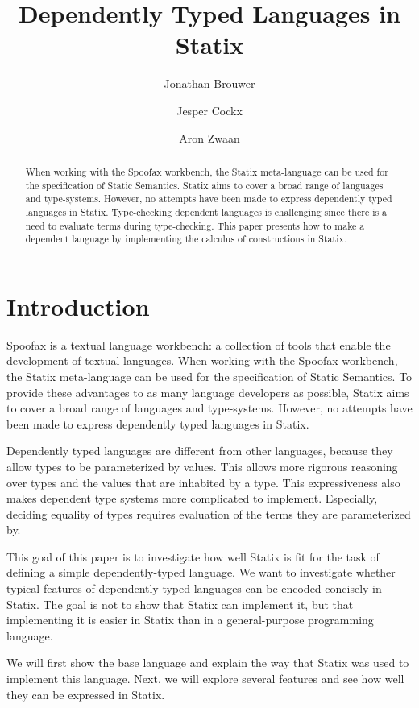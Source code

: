 \documentclass[a4paper,UKenglish,cleveref, autoref, thm-restate]{oasics-v2021}
\title{Dependently Typed Languages in Statix}
\author{Jonathan Brouwer}{Delft University of Technology, The Netherlands \and \url{http://jonathanb.nl}}{j.t.brouwer@student.tudelft.nl}{}{}
\author{Jesper Cockx}{Delft University of Technology, The Netherlands \and \url{http://jesper.sikanda.be}}{j.g.h.cockx@tudelft.nl}{}{}
\author{Aron Zwaan}{Delft University of Technology, The Netherlands \and \url{http://aronzwaan.github.io}}{a.s.zwaan@tudelft.nl}{}{}
\begin{document}
\maketitle

\begin{abstract}
When working with the Spoofax workbench, the Statix meta-language can be used for the specification of Static Semantics. Statix aims to cover a broad range of languages and type-systems. However, no attempts have been made to express dependently typed languages in Statix. Type-checking dependent languages is challenging since there is a need to evaluate terms during type-checking. This paper presents how to make a dependent language by implementing the calculus of constructions in Statix. 
\end{abstract}

\section{Introduction}

Spoofax is a textual language workbench: \label{key}a collection of tools that enable the development of textual languages\cite{spoofax}. When working with the Spoofax workbench, the Statix meta-language can be used for the specification of Static Semantics. To provide these advantages to as many language developers as possible, Statix aims to cover a broad range of languages and type-systems. However, no attempts have been made to express dependently typed languages in Statix. 

Dependently typed languages are different from other languages, because they allow types to be parameterized by values. This allows more rigorous reasoning over types and the values that are inhabited by a type. This expressiveness also makes dependent type systems more complicated to implement. Especially, deciding equality of types requires evaluation of the terms they are parameterized by. 

This goal of this paper is to investigate how well Statix is fit for the task of defining a simple dependently-typed language. We want to investigate whether typical features of dependently typed languages can be encoded concisely in Statix. The goal is not to show that Statix can implement it, but that implementing it is easier in Statix than in a general-purpose programming language. 

We will first show the base language and explain the way that Statix was used to implement this language. Next, we will explore several features and see how well they can be expressed in Statix.
\end{document}
